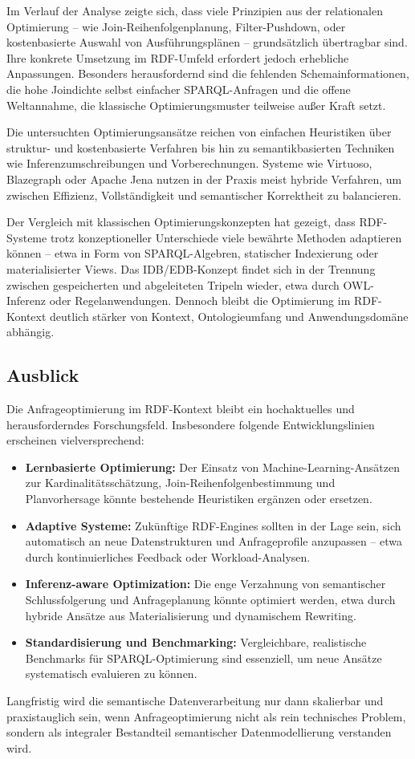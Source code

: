 \documentclass[12pt]{article}
\begin{document}
Im Verlauf der Analyse zeigte sich, dass viele Prinzipien aus der relationalen Optimierung – wie Join-Reihenfolgenplanung, Filter-Pushdown, oder kostenbasierte Auswahl von Ausführungsplänen – grundsätzlich übertragbar sind. Ihre konkrete Umsetzung im RDF-Umfeld erfordert jedoch erhebliche Anpassungen. Besonders herausfordernd sind die fehlenden Schemainformationen, die hohe Joindichte selbst einfacher SPARQL-Anfragen und die offene Weltannahme, die klassische Optimierungsmuster teilweise außer Kraft setzt.

Die untersuchten Optimierungsansätze reichen von einfachen Heuristiken über struktur- und kostenbasierte Verfahren bis hin zu semantikbasierten Techniken wie Inferenzumschreibungen und Vorberechnungen. Systeme wie Virtuoso, Blazegraph oder Apache Jena nutzen in der Praxis meist hybride Verfahren, um zwischen Effizienz, Vollständigkeit und semantischer Korrektheit zu balancieren.

Der Vergleich mit klassischen Optimierungskonzepten hat gezeigt, dass RDF-Systeme trotz konzeptioneller Unterschiede viele bewährte Methoden adaptieren können – etwa in Form von SPARQL-Algebren, statischer Indexierung oder materialisierter Views. Das IDB/EDB-Konzept findet sich in der Trennung zwischen gespeicherten und abgeleiteten Tripeln wieder, etwa durch OWL-Inferenz oder Regelanwendungen. Dennoch bleibt die Optimierung im RDF-Kontext deutlich stärker von Kontext, Ontologieumfang und Anwendungsdomäne abhängig.

\subsection*{Ausblick}

Die Anfrageoptimierung im RDF-Kontext bleibt ein hochaktuelles und herausforderndes Forschungsfeld. Insbesondere folgende Entwicklungslinien erscheinen vielversprechend:

\begin{itemize}
    \item \textbf{Lernbasierte Optimierung:} Der Einsatz von Machine-Learning-Ansätzen zur Kardinalitätsschätzung, Join-Reihenfolgenbestimmung und Planvorhersage könnte bestehende Heuristiken ergänzen oder ersetzen.
    
    \item \textbf{Adaptive Systeme:} Zukünftige RDF-Engines sollten in der Lage sein, sich automatisch an neue Datenstrukturen und Anfrageprofile anzupassen – etwa durch kontinuierliches Feedback oder Workload-Analysen.
    
    \item \textbf{Inferenz-aware Optimization:} Die enge Verzahnung von semantischer Schlussfolgerung und Anfrageplanung könnte optimiert werden, etwa durch hybride Ansätze aus Materialisierung und dynamischem Rewriting.
    
    \item \textbf{Standardisierung und Benchmarking:} Vergleichbare, realistische Benchmarks für SPARQL-Optimierung sind essenziell, um neue Ansätze systematisch evaluieren zu können.
\end{itemize}

Langfristig wird die semantische Datenverarbeitung nur dann skalierbar und praxistauglich sein, wenn Anfrageoptimierung nicht als rein technisches Problem, sondern als integraler Bestandteil semantischer Datenmodellierung verstanden wird.


\printbibliography
\end{document}
